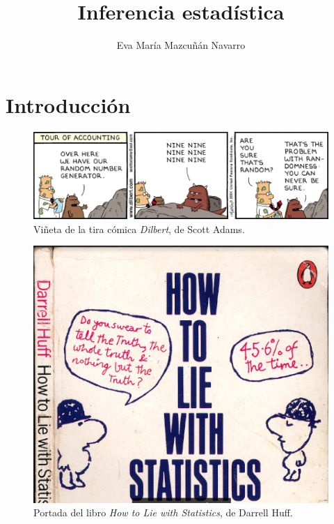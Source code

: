 \documentclass[
  notoc,
  nobib,
  degree=inf]{mnye}
\title{Inferencia estadística}
\author{Eva María Mazcuñán Navarro}
\date{}
\begin{document}
\maketitle

%

{
\hypersetup{linkcolor=etoccolor}
\setcounter{tocdepth}{2}
\tableofcontents
}
\hypertarget{section}{%
\section*{}\label{section}}

\hypertarget{intro}{%
\section*{Introducción}\label{intro}}



\begin{figure}

{\centering \includegraphics[width=1\linewidth]{graficos/dilbertc} 

}

\caption{Viñeta de la tira cómica \emph{Dilbert}, de Scott Adams.}\label{fig:dilbert}
\end{figure}



\begin{figure}

{\centering \includegraphics[width=0.7\linewidth]{graficos/HowToLieWithStatistics4} 

}

\caption{Portada del libro \emph{How to Lie with Statistics}, de Darrell Huff.}\label{fig:lie}
\end{figure}
\end{document}
